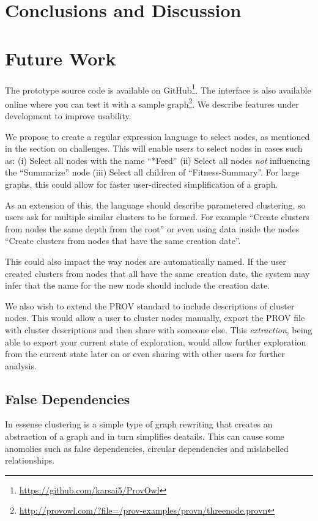 \chapter{Conclusions and Discussion} %
\chapter{Future Work}
The prototype source code is available on GitHub\footnote{\url{https://github.com/karsai5/ProvOwl}}. The interface is also available online where you can test it with a sample graph\footnote{\url{http://provowl.com/?file=/prov-examples/provn/threenode.provn}}.
We describe features under development to improve usability.

We propose to create a regular expression language to select nodes, as mentioned in the section on challenges. 
This will enable users to select nodes in cases such as:
(i) Select all nodes with the name ``*Feed''
(ii) Select all nodes \textit{not} influencing the ``Summarize'' node
(iii) Select all children of ``Fitness-Summary''.
For large graphs, this could allow for faster user-directed simplification of a graph. 

As an extension of this, the language should describe parametered clustering, so users ask for multiple similar clusters to be formed. For example ``Create clusters from nodes the same depth from the root'' or even using data inside the nodes ``Create clusters from nodes that have the same creation date''.  

This could also impact the way nodes are automatically named. If the user created clusters from nodes that all have the same creation date, the system may infer that the name for the new node should include the creation date.

We also wish to extend the PROV standard to include descriptions of cluster nodes. This would allow a user to cluster nodes manually, export the PROV file with cluster descriptions and then share with someone else. This \textit{extraction}, being able to export your current state of exploration, would allow further exploration from the current state later on or even sharing with other users for further analysis.

\section{False Dependencies}
\label{sec:section_name}

In essense clustering is a simple type of graph rewriting that creates an abstraction of a graph and in turn simplifies deatails. This can cause some anomolies such as false dependencies, circular dependencies and mislabelled relationships. 

